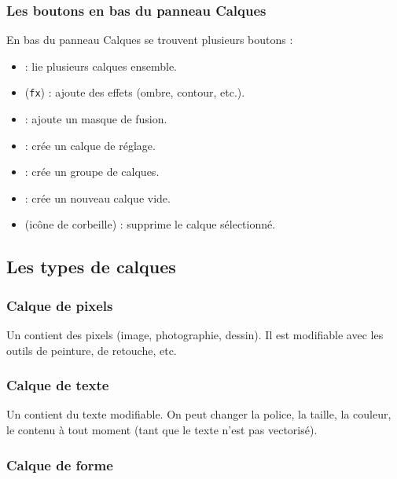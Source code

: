 \subsubsection{Les boutons en bas du panneau Calques}

En bas du panneau Calques se trouvent plusieurs boutons :

\begin{itemize}
    \item {} : lie plusieurs calques ensemble.
    \item {} (\texttt{fx}) : ajoute des effets (ombre, contour, etc.).
    \item {} : ajoute un masque de fusion.
    \item {} : crée un calque de réglage.
    \item {} : crée un groupe de calques.
    \item {} : crée un nouveau calque vide.
    \item {} (icône de corbeille) : supprime le calque sélectionné.
\end{itemize}

\subsection{Les types de calques}

\subsubsection{Calque de pixels}

Un  contient des pixels (image, photographie, dessin). Il est modifiable avec les outils de peinture, de retouche, etc.

\subsubsection{Calque de texte}

Un  contient du texte modifiable. On peut changer la police, la taille, la couleur, le contenu à tout moment (tant que le texte n'est pas vectorisé).

\subsubsection{Calque de forme}

